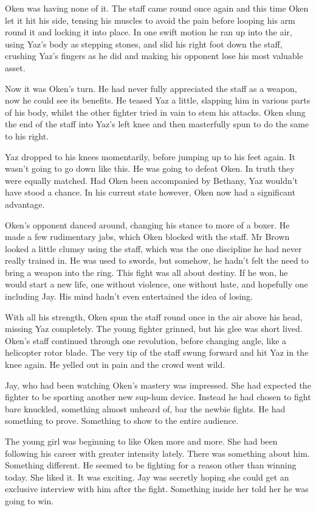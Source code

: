 Oken was having none of it.  The staff came round once again and this time Oken let it hit his side, tensing his muscles to avoid the pain before looping his arm round it and locking it into place.  In one swift motion he ran up into the air, using Yaz's body as stepping stones, and slid his right foot down the staff, crushing Yaz's fingers as he did and making his opponent lose his most valuable  asset.  

Now it was Oken's turn.  He had never fully appreciated the staff as a weapon, now he could see its benefits.  He teased Yaz a little, slapping him in various parts of his body, whilst the other fighter tried in vain to stem his attacks.  Oken slung the end of the staff into Yaz's left knee and then masterfully spun to do the same to his right.  

Yaz dropped to his knees momentarily, before jumping up to his feet again.  It wasn't going to go down like this.  He was going to defeat Oken.  In truth they were equally matched.  Had Oken been accompanied by Bethany, Yaz wouldn't have stood a chance.  In his current state however, Oken now had a significant advantage.  

Oken's opponent danced around, changing his stance to more of a boxer.  He made a few rudimentary jabs, which Oken blocked with the staff.  Mr Brown looked a little clumsy using the staff, which was the one discipline he had never really trained in.  He was used to swords, but somehow, he hadn't felt the need to bring a weapon into the ring.  This fight was all about destiny.  If he won, he would start a new life, one without violence, one without hate, and hopefully one including Jay.  His mind hadn't even entertained the idea of losing.

With all his strength, Oken spun the staff round once in the air above his head, missing Yaz completely.  The young fighter grinned, but his glee was short lived.  Oken's staff continued through one revolution, before changing angle, like a helicopter rotor blade.  The very tip of the staff swung forward and hit Yaz in the knee again.  He yelled out in pain and the crowd went wild.

Jay, who had been watching Oken's mastery was impressed.  She had expected the fighter to be sporting another new sup-hum device.  Instead he had chosen to fight bare knuckled, something almost unheard of, bar the newbie fights.  He had something to prove.  Something to show to the entire audience.

The young girl was beginning to like Oken more and more.  She had been following his career with greater intensity lately.  There was something about him.  Something different.  He seemed to be fighting for a reason other than winning today.  She liked it.  It was exciting.  Jay was secretly hoping she could get an exclusive interview with him after the fight.  Something inside her told her he was going to win.  

